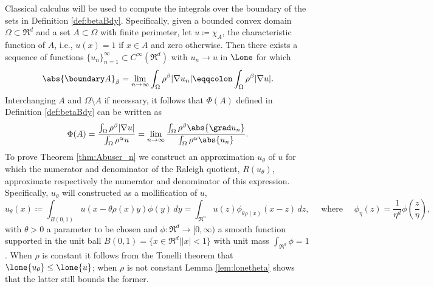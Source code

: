 
Classical calculus will be used to compute the integrals over the
boundary of the sets in Definition \ref{def:betaBdy}.  Specifically,
given a bounded convex domain $\Omega \subset \Re^d$
and a set $A \subset \Omega$ with finite perimeter, let $u\coloneqq \chi_A$, the characteristic function of $A$, i.e., $u(x) =
1$ if $x \in A$ and zero otherwise.  Then there exists a sequence of
functions $\{u_n\}_{n=1}^\infty \subset C^\infty(\Re^d)$ with $u_n
\rightarrow u$ in $\Lone$ for which \cite{EvansMeasure15}
\begin{equation} \label{eqn:Aapprox}
\abs{\boundary A}_\beta
= \lim_{n \rightarrow \infty} \int_\Omega  \rho^\beta|\nabla u_n|
\eqqcolon  \int_\Omega  \rho^\beta|\nabla u|.
\end{equation}
Interchanging $A$ and $\Omega \setminus A$ if necessary, it follows that
$\Phi(A)$ defined in Definition \ref{def:betaBdy} can be written as
$$
\Phi(A) 
= \frac{\int_\Omega \rho^\beta |\nabla u|}{\int_\Omega \rho^\alpha u}
= \lim_{n\to\infty}\frac{\int_\Omega \rho^\beta\abs{\grad u_n}}{\int_\Omega\rho^\alpha \abs{u_n}}.
$$
To prove Theorem \ref{thm:Abuser_n} we construct an approximation $u_\theta$ of
$u$ for which the numerator and denominator of the Raleigh quotient, $R(u_\theta)$,
approximate respectively the numerator and denominator of this expression.
Specifically, $u_\theta$ will constructed as a mollification of $u$,
\begin{equation} \label{eqn:Autheta}
u_\theta(x) 
\coloneqq \int_{B(0,1)} \!\!\! u(x-\theta \rho(x) y) \phi(y) \, dy
= \int_{\Re^n} \! u(z) \phi_{\theta \rho(x)}(x-z) \, dz,
\quad \text{ where } \quad
\phi_{\eta}(z) 
= \frac{1}{\eta^d} \phi\left(\frac{z}{\eta}\right),
\end{equation}
with $\theta > 0$ a parameter to be chosen and $\phi:\Re^d \rightarrow
[0,\infty)$ a smooth function supported in the unit ball $B(0,1)=\{x
\in \Re^d| |x| < 1\}$ with unit mass $\int_{\Re^d} \phi = 1$. When
$\rho$ is constant it follows from the Tonelli theorem that
$\lone{u_\theta} \leq \lone{u}$; when $\rho$ is not constant Lemma
\ref{lem:lonetheta} shows that the latter still bounds the former.


